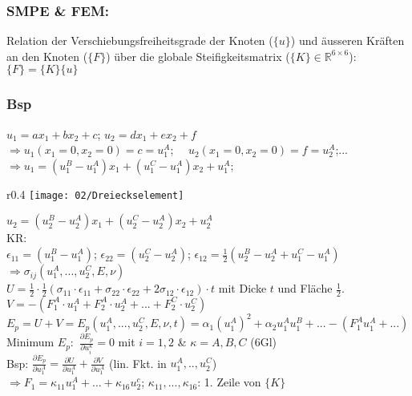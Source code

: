         \subsubsection{SMPE \& FEM:}
            Relation der Verschiebungsfreiheitsgrade der Knoten ($\{u\}$) und äusseren Kräften an den Knoten ($\{F\}$) über die globale Steifigkeitsmatrix ($\{K\}\in\mathbb{R}^{6\times6}$): $\{F\}=\{K\}\{u\}$

        \subsubsection{Bsp}
            $u_1=ax_1+bx_2+c$; $u_2=dx_1+ex_2+f$\\
            $\Rightarrow u_1(x_1=0,x_2=0)=c=u_1^A$; $\quad u_2(x_1=0,x_2=0)=f=u_2^A$;...\\
            $\Rightarrow u_1=(u_1^B-u_1^A)x_1+(u_1^C-u_1^A)x_2+u_1^A$;\\
            \begin{wrapfigure}[6]{r}{0.4\linewidth}
                \vspace{-8mm}
                \texttt{[image: 02/Dreieckselement]}
            \end{wrapfigure}
            $u_2=(u_2^B-u_2^A)x_1+(u_2^C-u_2^A)x_2+u_2^A$\\
            KR:\\
            $\epsilon_{11}=(u_1^B-u_1^A)$; $\epsilon_{22}=(u_2^C-u_2^A)$; $\epsilon_{12}=\frac{1}{2}(u_2^B-u_2^A+u_1^C-u_1^A)$
            $\Rightarrow\sigma_{ij}(u_1^A,...,u_2^C,E,\nu)$\\
            $U=\frac{1}{2}\cdot\frac{1}{2}(\sigma_{11}\cdot\epsilon_{11}+\sigma_{22}\cdot\epsilon_{22}+2\sigma_{12}\cdot\epsilon_{12})\cdot t$ mit Dicke $t$ und Fläche $\frac{1}{2}$.\\
            $V=-(F_1^A\cdot u_1^A+F_2^A\cdot u_2^A+...+F_2^C\cdot u_2^C)$\\
            $E_p=U+V=E_p(u_1^A,...,u_2^C,E,\nu,t)=\alpha_1(u_1^A)^2+\alpha_2u_1^Au_1^B+ ...-(F_1^Au_1^A+...)$\\
            Minimum $E_p:$ $\frac{\partial E_p}{\partial u_i^\kappa}=0$ mit $i=1,2$ \& $\kappa=A,B,C$ (6Gl)\\
            Bsp: $\frac{\partial E_p}{\partial u_1^A}=\frac{\partial U}{\partial u_1^A}+\frac{\partial V}{\partial u_1^A}$ (lin. Fkt. in $u_1^A,..,u_2^C$) \\$\Rightarrow F_1=\kappa_{11}u_1^A+...+\kappa_{16}u_2^c$; $\kappa_{11},...,\kappa_{16}$: 1. Zeile von $\{K\}$